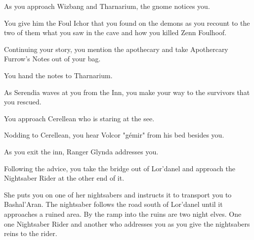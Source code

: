 As you approach Wizbang and Tharnarium, the gnome notices you.


You give him the Foul Ichor that you found on the demons as you recount to the two of them what you saw in the cave and how you killed Zenn Foulhoof.




Continuing your story, you mention the apothecary and take Apothercary Furrow's Notes out of your bag.


You hand the notes to Tharnarium.


As Serendia waves at you from the Inn, you make your way to the survivors that you rescued.  %

You approach Cerellean who is staring at the see.


Nodding to Cerellean, you hear Volcor "gémir" from his bed besides you.


As you exit the inn, Ranger Glynda addresses you.



Following the advice, you take the bridge out of Lor'danel and approach the Nightsaber Rider at the other end of it.



She puts you on one of her nightsabers and instructs it to transport you to Bashal'Aran. The nightsaber follows the road south of Lor'danel until it approaches a ruined area. By the ramp into the ruins are two night elves. One one Nightsaber Rider and another who addresses you as you give the nightsabers reins to the rider.

